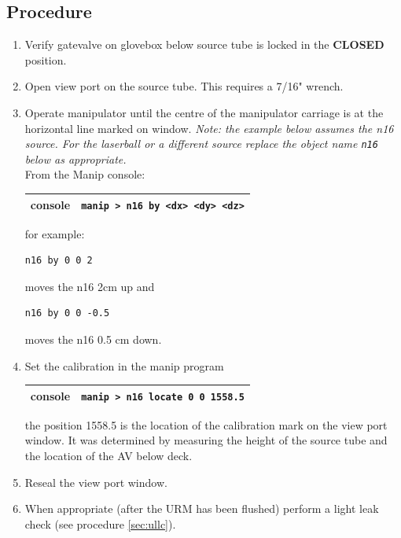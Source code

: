 \subsection{Procedure}
\begin{enumerate}
\item \CheckBox[name=ucl1]{} Verify gatevalve on glovebox below source tube is locked in the {\bf CLOSED} position.
\item \CheckBox[name=ucl2]{} Open view port on the source tube. This requires a 7/16" wrench.
\item \CheckBox[name=ucl3]{} Operate manipulator until the centre of the manipulator carriage is at the horizontal line marked on window. {\it Note: the example below assumes the n16 source. For the laserball or a different source replace the object name \verb+n16+ below as appropriate.}\\
From the Manip console: 
\begin{center}
\begin{tabular}{|c|c|}
\hline
console & \verb+manip > n16 by <dx> <dy> <dz>+\\
\hline
\end{tabular}
\end{center}
for example: 
\begin{center}
\begin{verbatim}
n16 by 0 0 2
\end{verbatim}
\end{center}
moves the n16 2cm up and 
\begin{center}
\begin{verbatim}
n16 by 0 0 -0.5
\end{verbatim}
\end{center}
moves the n16 0.5 cm down.
\item \CheckBox[name=ucl4]{} Set the calibration in the manip program
\begin{center}
\begin{tabular}{|c|c|}
\hline
console & \verb+manip > n16 locate 0 0 1558.5+ \\
\hline
\end{tabular}
\end{center}
the position 1558.5 is the location of the calibration mark on the view port window. It was determined by measuring the height of the source tube and the location of the AV below deck.
\item \CheckBox[name=ucl5]{} Reseal the view port window.
\item \CheckBox[name=ucl6]{} When appropriate (after the URM has been flushed) perform a light leak check (see procedure \ref{sec:ullc}).
\end{enumerate}

